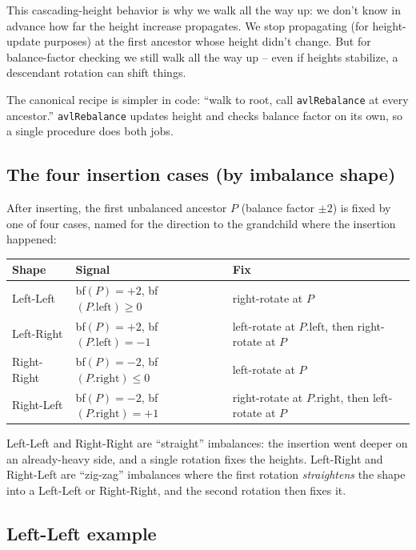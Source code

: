 \documentclass[11pt]{article}
\begin{document}
This cascading-height behavior is why we walk all the way up: we don't know in advance how far the height increase propagates. We stop propagating (for height-update purposes) at the first ancestor whose height didn't change. But for balance-factor checking we still walk all the way up -- even if heights stabilize, a descendant rotation can shift things.

The canonical recipe is simpler in code: ``walk to root, call \texttt{avlRebalance} at every ancestor.'' \texttt{avlRebalance} updates height and checks balance factor on its own, so a single procedure does both jobs.

\subsection*{The four insertion cases (by imbalance shape)}

After inserting, the first unbalanced ancestor $P$ (balance factor $\pm 2$) is fixed by one of four cases, named for the direction to the grandchild where the insertion happened:

\begin{center}
\begin{tabular}{lll}
Shape       & Signal                       & Fix \\
\hline
Left-Left   & bf$(P) = +2$, bf$(P.\text{left}) \ge 0$  & right-rotate at $P$ \\
Left-Right  & bf$(P) = +2$, bf$(P.\text{left}) = -1$   & left-rotate at $P.\text{left}$, then right-rotate at $P$ \\
Right-Right & bf$(P) = -2$, bf$(P.\text{right}) \le 0$ & left-rotate at $P$ \\
Right-Left  & bf$(P) = -2$, bf$(P.\text{right}) = +1$  & right-rotate at $P.\text{right}$, then left-rotate at $P$ \\
\end{tabular}
\end{center}

Left-Left and Right-Right are ``straight'' imbalances: the insertion went deeper on an already-heavy side, and a single rotation fixes the heights. Left-Right and Right-Left are ``zig-zag'' imbalances where the first rotation \emph{straightens} the shape into a Left-Left or Right-Right, and the second rotation then fixes it.

\subsection*{Left-Left example}
\end{document}
